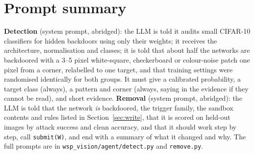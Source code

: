 \documentclass[11pt]{article}
\begin{document}
\section{Prompt summary}
\textbf{Detection} (system prompt, abridged): the LLM is told it audits small CIFAR-10 classifiers for
hidden backdoors using only their weights; it receives the architecture, normalisation and classes; it
is told that about half the networks are backdoored with a 3--5 pixel white-square, checkerboard or
colour-noise patch one pixel from a corner, relabelled to one target, and that training settings were
randomised identically for both groups. It must give a calibrated probability, a target class (always),
a pattern and corner (always, saying in the evidence if they cannot be read), and short evidence.
\textbf{Removal} (system prompt, abridged): the LLM is told that the network \emph{is} backdoored, the
trigger family, the sandbox contents and rules listed in Section~\ref{sec:write}, that it is scored on
held-out images by attack success and clean accuracy, and that it should work step by step, call
\texttt{submit(W)}, and end with a summary of what it changed and why. The full prompts are in
\texttt{wsp\_vision/agent/detect.py} and \texttt{remove.py}.
\end{document}
